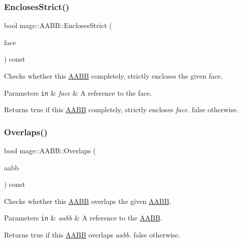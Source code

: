 \subsubsection{\texorpdfstring{Encloses\+Strict()}{EnclosesStrict()}\hspace{0.1cm}{\footnotesize\ttfamily [3/3]}}
{\footnotesize\ttfamily bool mage\+::\+A\+A\+B\+B\+::\+Encloses\+Strict (\begin{DoxyParamCaption}\item[{const \hyperlink{structmage_1_1_face}{Face} \&}]{face }\end{DoxyParamCaption}) const}

Checks whether this \hyperlink{structmage_1_1_a_a_b_b}{A\+A\+BB} completely, strictly encloses the given face.


\begin{DoxyParams}[1]{Parameters}
\mbox{\tt in}  & {\em face} & A reference to the face. \\
\hline
\end{DoxyParams}
\begin{DoxyReturn}{Returns}
{\ttfamily true} if this \hyperlink{structmage_1_1_a_a_b_b}{A\+A\+BB} completely, strictly encloses {\itshape face}. {\ttfamily false} otherwise. 
\end{DoxyReturn}
\hypertarget{structmage_1_1_a_a_b_b_a5a959edc3bc5ccdd29025d612c2e66e3}{}\label{structmage_1_1_a_a_b_b_a5a959edc3bc5ccdd29025d612c2e66e3} 
\subsubsection{\texorpdfstring{Overlaps()}{Overlaps()}}
{\footnotesize\ttfamily bool mage\+::\+A\+A\+B\+B\+::\+Overlaps (\begin{DoxyParamCaption}\item[{const \hyperlink{structmage_1_1_a_a_b_b}{A\+A\+BB} \&}]{aabb }\end{DoxyParamCaption}) const}

Checks whether this \hyperlink{structmage_1_1_a_a_b_b}{A\+A\+BB} overlaps the given \hyperlink{structmage_1_1_a_a_b_b}{A\+A\+BB}.


\begin{DoxyParams}[1]{Parameters}
\mbox{\tt in}  & {\em aabb} & A reference to the \hyperlink{structmage_1_1_a_a_b_b}{A\+A\+BB}. \\
\hline
\end{DoxyParams}
\begin{DoxyReturn}{Returns}
{\ttfamily true} if this \hyperlink{structmage_1_1_a_a_b_b}{A\+A\+BB} overlaps {\itshape aabb}. {\ttfamily false} otherwise. 
\end{DoxyReturn}
\hypertarget{structmage_1_1_a_a_b_b_ae8e6eca9c5e30015a91ab2e900594bfc}{}\label{structmage_1_1_a_a_b_b_ae8e6eca9c5e30015a91ab2e900594bfc} 
